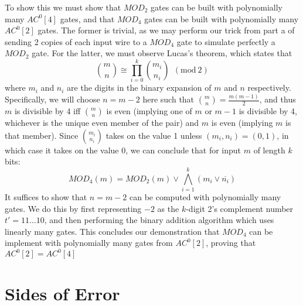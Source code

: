 \documentclass{article}
\begin{document}
\begin{alphalist}
\item To show this we must show that $MOD_2$ gates can be built with polynomially many $AC^0[4]$ gates, and that $MOD_4$ gates can be built with polynomially many $AC^0[2]$ gates. The former is trivial, as we may perform our trick from part a of sending 2 copies of each input wire to a $MOD_4$ gate to simulate perfectly a $MOD_2$ gate. For the latter, we must observe Lucas's theorem, which states that $$\binom{m}{n} \cong \prod_{i = 0}^k\binom{m_i}{n_i}~~(\text{mod}~2)$$ where $m_i$ and $n_i$ are the digits in the binary expansion of $m$ and $n$ respectively. Specifically, we will choose $n = m-2$ here such that $\binom{m}{n} = \frac{m(m-1)}{2}$, and thus $m$ is divisible by 4 iff $\binom{m}{n}$ is even (implying one of $m$ or $m-1$ is divisible by 4, whichever is the unique even member of the pair) and $m$ is even (implying $m$ is that member). Since $\binom{m_i}{n_i}$ takes on the value 1 unless $(m_i, n_i) = (0, 1)$, in which case it takes on the value 0, we can conclude that for input $m$ of length $k$ bits: $$MOD_4(m) = MOD_2(m) \vee \bigwedge_{i = 1}^k(m_i \vee \overline{n_i})$$ It suffices to show that $n = m-2$ can be computed with polynomially many gates. We do this by first representing $-2$ as the $k$-digit 2's complement number $t'=11\ldots10$, and then performing the binary addition algorithm which uses linearly many gates. This concludes our demonstration that $MOD_4$ can be implement with polynomially many gates from $AC^0[2]$, proving that $AC^0[2] = AC^0[4]$
\end{alphalist}
\section{Sides of Error}
\newcommand{\RP}{\mathbf{RP}}
\newcommand{\ZPP}{\mathbf{ZPP}}
\newcommand{\BPP}{\mathbf{BPP}}
\newcommand{\NP}{\mathbf{NP}}
\newcommand{\coRP}{\mathbf{coRP}}
\end{document}
